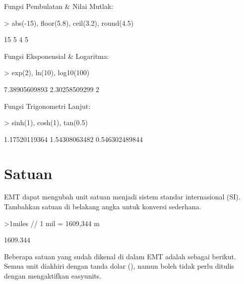 \documentclass{article}
\newenvironment{eulernotebook}{\par}{\par}
\newcommand{\eulerheading}[1]{\section{#1}}
\newenvironment{eulercomment}{\par\medskip}{\par\medskip}
\begin{document}
\begin{eulernotebook}
\begin{eulercomment}
Fungsi Pembulatan \& Nilai Mutlak:
\end{eulercomment}
\begin{eulerprompt}
> abs(-15), floor(5.8), ceil(3.2), round(4.5)
\end{eulerprompt}
\begin{euleroutput}
  15
  5
  4
  5
\end{euleroutput}
\begin{eulercomment}
Fungsi Eksponensial \& Logaritma:
\end{eulercomment}
\begin{eulerprompt}
> exp(2), ln(10), log10(100)
\end{eulerprompt}
\begin{euleroutput}
  7.38905609893
  2.30258509299
  2
\end{euleroutput}
\begin{eulercomment}
Fungsi Trigonometri Lanjut:
\end{eulercomment}
\begin{eulerprompt}
> sinh(1), cosh(1), tan(0.5)
\end{eulerprompt}
\begin{euleroutput}
  1.17520119364
  1.54308063482
  0.546302489844
\end{euleroutput}
\eulerheading{Satuan}
\begin{eulercomment}
EMT dapat mengubah unit satuan menjadi sistem standar internasional
(SI). Tambahkan satuan di belakang angka untuk konversi sederhana.
\end{eulercomment}
\begin{eulerprompt}
>1miles  // 1 mil = 1609,344 m
\end{eulerprompt}
\begin{euleroutput}
  1609.344
\end{euleroutput}
\begin{eulercomment}
Beberapa satuan yang sudah dikenal di dalam EMT adalah sebagai
berikut. Semua unit diakhiri dengan tanda dolar (\textdollar{}), namun boleh tidak
perlu ditulis dengan mengaktifkan easyunits. 


\end{eulercomment}
\end{eulernotebook}
\end{document}
